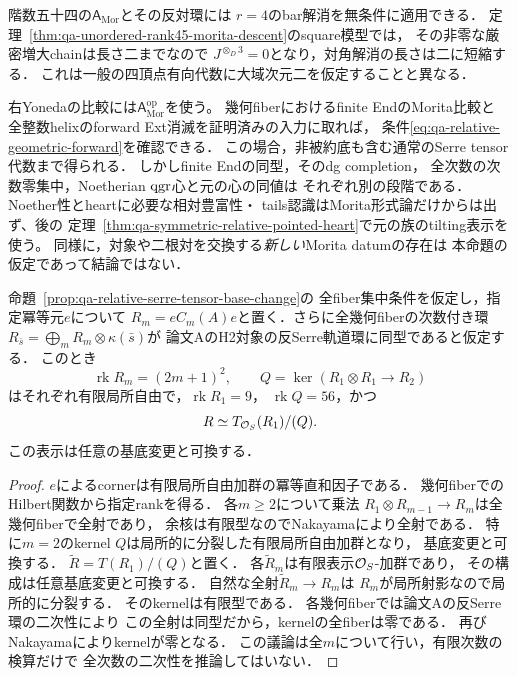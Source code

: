 \begin{remark}[四頂点模型への適用と残る認識問題]
\label{rem:qa-relative-serre-application-scope}
階数五十四の$\mathsf A_{\mathrm{Mor}}$とその反対環には
$r=4$のbar解消を無条件に適用できる．
定理~\ref{thm:qa-unordered-rank45-morita-descent}のsquare模型では，
その非零な厳密増大chainは長さ二までなので
$J^{\otimes_D3}=0$となり，対角解消の長さは二に短縮する．
これは一般の四頂点有向代数に大域次元二を仮定することと異なる．

右Yonedaの比較には$\mathsf A_{\mathrm{Mor}}^{\mathrm{op}}$を使う。
幾何fiberにおけるfinite EndのMorita比較と
全整数helixのforward Ext消滅を証明済みの入力に取れば，
条件\eqref{eq:qa-relative-geometric-forward}を確認できる．
この場合，非被約底も含む通常のSerre tensor代数まで得られる．
しかしfinite Endの同型，そのdg completion，
全次数の次数零集中，Noetherian $\operatorname{qgr}$心と元の心の同値は
それぞれ別の段階である．Noether性とheartに必要な相対豊富性・
tails認識はMorita形式論だけからは出ず、後の
定理~\ref{thm:qa-symmetric-relative-pointed-heart}で元の族のtilting表示を使う。
同様に，対象や二根対を交換する\emph{新しい}Morita datumの存在は
本命題の仮定であって結論ではない．
\end{remark}


\begin{corollary}[pointed反Serre環の相対二次表示]
\label{cor:qa-morita-relative-antiserre-quadratic}
命題~\ref{prop:qa-relative-serre-tensor-base-change}の
全fiber集中条件を仮定し，指定冪等元$e$について
$R_m=eC_m(A)e$と置く．さらに全幾何fiberの次数付き環
$R_{\bar s}=\bigoplus_mR_m\otimes\kappa(\bar s)$が
論文AのH2対象の反Serre軌道環に同型であると仮定する．
このとき
\[
\operatorname{rk}R_m=(2m+1)^2,\qquad
Q=\ker(R_1\otimes R_1\longrightarrow R_2)
\]
はそれぞれ有限局所自由で，$\operatorname{rk}R_1=9$，
$\operatorname{rk}Q=56$，かつ
\[
R\simeq T_{\mathcal O_S}(R_1)/(Q).
\]
この表示は任意の基底変更と可換する．
\end{corollary}
\begin{proof}
$e$によるcornerは有限局所自由加群の冪等直和因子である．
幾何fiberでのHilbert関数から指定rankを得る．
各$m\ge2$について乗法
$R_1\otimes R_{m-1}\to R_m$は全幾何fiberで全射であり，
余核は有限型なのでNakayamaにより全射である．
特に$m=2$のkernel $Q$は局所的に分裂した有限局所自由加群となり，
基底変更と可換する．
$\widetilde R=T(R_1)/(Q)$と置く．
各$\widetilde R_m$は有限表示$\mathcal O_S$-加群であり，
その構成は任意基底変更と可換する．
自然な全射$\widetilde R_m\to R_m$は
$R_m$が局所射影なので局所的に分裂する．
そのkernelは有限型である．
各幾何fiberでは論文Aの反Serre環の二次性により
この全射は同型だから，kernelの全fiberは零である．
再びNakayamaによりkernelが零となる．
この議論は全$m$について行い，有限次数の検算だけで
全次数の二次性を推論してはいない．
\end{proof}


